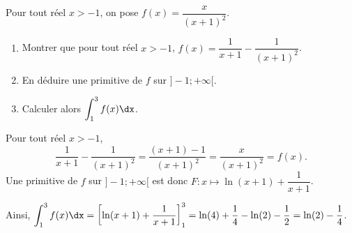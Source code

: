 \documentclass[11pt,fleqn, openany]{book} %
\begin{document}
 
  
 \begin{exercise}[topic=int02]
Pour tout réel $x> -1$, on pose $f(x)=\dfrac{x}{(x+1)^2}$.

\begin{enumerate}
\item Montrer que pour tout réel $x>-1$, $f(x)=\dfrac{1}{x+1}-\dfrac{1}{(x+1)^2}$.
\item En déduire une primitive de $f$ sur $]-1;+\infty[$.
\item Calculer alors $\displaystyle\int_{1}^3 f(x)\dx$.
\end{enumerate}\end{exercise}


\begin{solution}
Pour tout réel \(x>-1\), 
\[\dfrac{1}{x+1}-\dfrac{1}{(x+1)^2}=\dfrac{(x+1)-1}{(x+1)^2}=\dfrac{x}{(x+1)^2}=f(x).\]
Une primitive de \(f\) sur \(]-1;+\infty[\) est donc \(F:x\mapsto \ln(x+1)+\dfrac{1}{x+1}\).

Ainsi, \(\displaystyle\int_{1}^3 f(x)\dx = \left[ \ln(x+1)+\dfrac{1}{x+1} \right]_1^3=\ln(4)+\dfrac{1}{4}-\ln(2)-\dfrac{1}{2}=\ln(2)-\dfrac{1}{4}\).
\end{solution}
\end{document}
